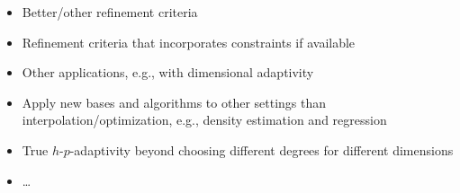\begin{frame}{\insertsubsection}
  \begin{itemize}
    \item
    Better/other refinement criteria
    
    \item
    Refinement criteria that incorporates constraints if available
    
    \item
    Other applications, e.g., with dimensional adaptivity
    
    \item
    Apply new bases and algorithms to other settings than
    interpolation/optimization, e.g., density estimation and regression
    
    \item
    True $h$-$p$-adaptivity beyond choosing different degrees for different
    dimensions
    
    \item
    \dots
  \end{itemize}
\end{frame}
